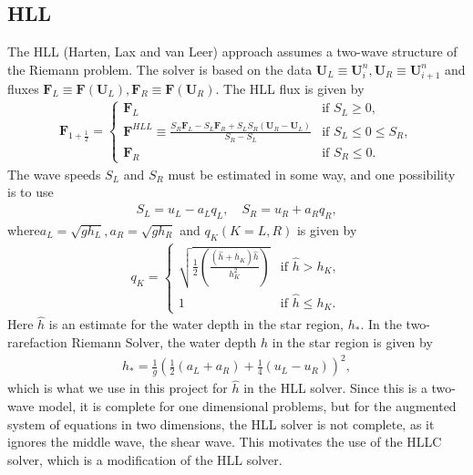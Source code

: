 \subsection*{HLL}
The HLL (Harten, Lax and van Leer) approach assumes a two-wave structure of the Riemann problem.
The solver is based on the data $\mathbf{U}_L \equiv \mathbf{U}_i^n, \mathbf{U}_R \equiv \mathbf{U}_{i+1}^n$ and fluxes $\mathbf{F}_L \equiv \mathbf{F}(\mathbf{U}_L), \mathbf{F}_R \equiv \mathbf{F}(\mathbf{U}_R)$.
The HLL flux is given by
\begin{align}\label{eq:HLL_flux}
    \mathbf{F}_{1 + \frac{1}{2}} = \begin{cases}
        \mathbf{F}_L & \text{if } S_L \geq 0, \\
        \mathbf{F}^{HLL} \equiv \frac{S_R \mathbf{F}_L - S_L \mathbf{F}_R + S_L S_R (\mathbf{U}_R - \mathbf{U}_L)}{S_R - S_L} & \text{if } S_L \leq 0 \leq S_R, \\
        \mathbf{F}_R & \text{if } S_R \leq 0.
    \end{cases}
\end{align}
The wave speeds $S_L$ and $S_R$ must be estimated in some way, and one possibility is to use 
\begin{align*}
    S_L = u_L - a_L q_L, \quad S_R = u_R + a_R q_R,
\end{align*}
where$a_L = \sqrt{g h_L}, a_R = \sqrt{g h_R}$ and  $q_K (K=L, R)$ is given by 
\begin{align*}
    q_K = 
    \begin{cases}
        \sqrt{\frac{1}{2}\left( \frac{(\hat{h} + h_K) \hat{h}}{h_K^2} \right) } & \text{if } \hat{h} > h_K, \\
        1 & \text{if } \hat{h} \leq h_K.
    \end{cases}
\end{align*}
Here $\hat{h}$ is an estimate for the water depth in the star region, $h_*$.
In the two-rarefaction Riemann Solver, the water depth $h$ in the star region is given by
\begin{align}\label{eq:two_rarefaction_hstar}
    h_* = \frac{1}{g} {\left( \frac{1}{2} (a_L + a_R) + \frac{1}{4} (u_L - u_R)  \right)}^2,
\end{align}
which is what we use in this project for $\hat{h}$ in the HLL solver.
Since this is a two-wave model, it is complete for one dimensional problems, but for the augmented system of equations in two dimensions, the HLL solver is not complete, as it ignores the middle wave, the shear wave.
This motivates the use of the HLLC solver, which is a modification of the HLL solver.

